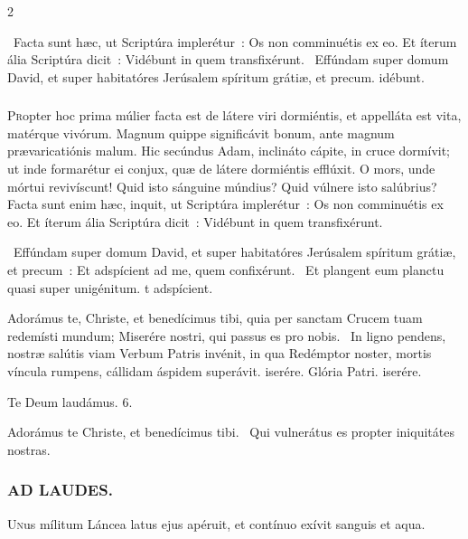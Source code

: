 \documentclass[9pt,twoside]{extarticle}
\begin{document}
\begin{multicols}{2}
\begin{tightlist}{}
\item {}~Facta sunt hæc, ut Scriptúra implerétur~: Os non comminuétis ex eo. Et íterum ália Scriptúra dicit~: \textred{*} Vidébunt in quem transfixérunt. ~Effúndam super domum David, et super habitatóres Jerúsalem spíritum grátiæ, et precum. idébunt.
\end{tightlist}

\subsubsection*{\center {}}
\lettrine{P}ropter hoc prima múlier facta est de látere viri dormiéntis, et appelláta est vita, matérque vivórum. Magnum quippe significávit bonum, ante magnum prævaricatiónis malum. Hic secúndus Adam, inclináto cápite, in cruce dormívit; ut inde formarétur ei conjux, quæ de látere dormiéntis efflúxit. O mors, unde mórtui revivíscunt! Quid isto sánguine múndius? Quid vúlnere isto salúbrius? Facta sunt enim hæc, inquit, ut Scriptúra implerétur~: Os non comminuétis ex eo. Et íterum ália Scriptúra dicit~: Vidébunt in quem transfixérunt.

\begin{tightlist}{}
\item {}~Effúndam super domum David, et super habitatóres Jerúsalem spíritum grátiæ, et precum~: \textred{*} Et adspícient ad me, quem confixérunt. ~Et plangent eum planctu quasi super unigénitum. t adspícient.
\item {}
\item {} Adorámus te, Christe, et benedícimus tibi, quia per sanctam Crucem tuam redemísti mundum; \textred{*} Miserére nostri, qui passus es pro nobis. ~In ligno pendens, nostræ salútis viam Verbum Patris invénit, in qua Redémptor noster, mortis víncula rumpens, cállidam áspidem superávit. iserére. Glória Patri. iserére.
\item Te Deum laudámus. 6.
\item {} Adorámus te Christe, et benedícimus tibi. ~Qui vulnerátus es propter iniquitátes nostras.
\end{tightlist}

\subsubsection*{\center \textsc{AD LAUDES.}}
\begin{center}\end{center}
\lettrine{U}nus mílitum Láncea latus ejus apéruit, et contínuo exívit sanguis et aqua.


\end{multicols}
\end{document}
